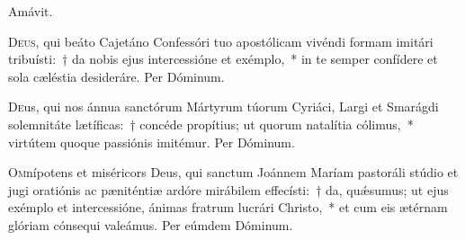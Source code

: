 \documentclass[vesperale_romanum.tex]{subfiles}
\begin{document}

\omniapraeter



\myrule


\duplex



\vv Amávit.

\oratio

\lettrine{D}{eus}, qui beáto Cajetáno Confessóri tuo apostólicam vivéndi formam imitári tribuísti:~† da nobis ejus intercessióne et exémplo,~* in te semper confídere et sola cæléstia desideráre. Per Dóminum.



\commemoration

\myrule



\oratio

\lettrine{D}{e}us, qui nos ánnua san\-ctórum Mártyrum túorum Cyriáci, Largi et Smarágdi sole\-mnitáte lætíficas:~† concéde propítius; ut quorum natalítia cólimus,~*  virtútem quoque passiónis
imitémur. Per Dóminum.


\myrule

\duplexmtv

\oratio

\lettrine{O}{m}nípotens et miséricors Deus, qui san\-ctum Joánnem Maríam pastoráli stúdio et jugi oratiónis ac pæniténtiæ ardóre mirábilem effecísti:~† da, quǽsumus; ut ejus exémplo et intercessióne, ánimas fratrum lucrári Christo,~* et cum eis ætérnam glóriam cónsequi valeámus. Per eúmdem Dóminum.

\end{document}
